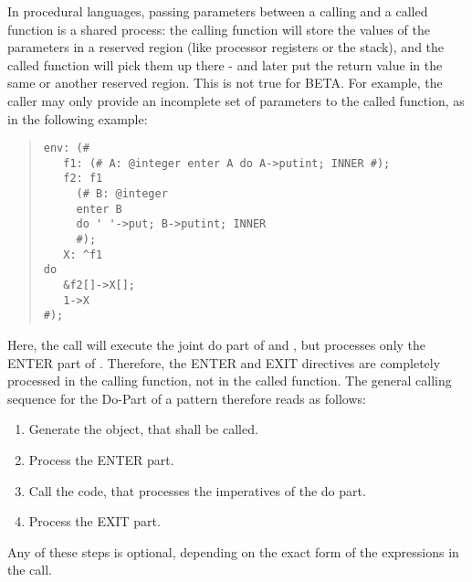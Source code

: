 In procedural languages, passing parameters between a calling and
a called function is a shared process: the calling function will
store the values of the parameters in a reserved region (like
processor registers or the stack), and the called function will
pick them up there - and later put the return value in the same
or another reserved region.  This is not true for BETA.  For
example, the caller may only provide an incomplete set of
parameters to the called function, as in the following example:
\begin{quote}\begin{verbatim}env: (#
   f1: (# A: @integer enter A do A->putint; INNER #);
   f2: f1
     (# B: @integer
     enter B
     do ' '->put; B->putint; INNER
     #);
   X: ^f1
do
   &f2[]->X[];
   1->X
#);
\end{verbatim}\end{quote}
Here, the call  will execute the joint do part of
 and , but processes only the ENTER part of
.  Therefore, the ENTER and EXIT directives are completely
processed in the calling function, not in the called function.
The general calling sequence for the Do-Part of a pattern
therefore reads as follows:
\begin{enumerate}
\item Generate the object, that shall be called.
\item Process the ENTER part.
\item Call the code, that processes the imperatives of the do part.
\item Process the EXIT part.
\end{enumerate}
Any of these steps is optional, depending on the exact form of the
expressions in the call.

